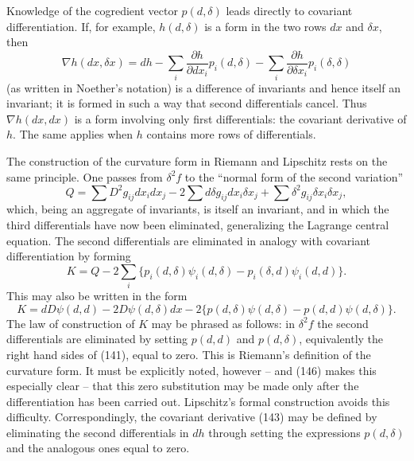 \documentclass[11pt]{article}
\begin{document}
Knowledge of the cogredient vector $p(d,\delta)$ leads directly to covariant differentiation. If, for example, $h(d,\delta)$ is a form in the two rows $dx$ and $\delta x$, then
\begin{equation}
  \nabla h(dx,\delta x)=dh-\sum_i \frac{\partial h}{\partial dx_i}p_i(d,\delta)-\sum_i\frac{\partial h}{\partial \delta x_i}p_i(\delta,\delta)            \tag{143}
\end{equation}
(as written in Noether's notation) is a difference of invariants and hence itself an invariant; it is formed in such a way that second differentials cancel. Thus $\nabla h(dx,dx)$ is a form involving only first differentials: the covariant derivative of $h$. The same applies when $h$ contains more rows of differentials.

The construction of the curvature form in Riemann and Lipschitz rests on the same principle. One passes from $\delta^2 f$ to the ``normal form of the second variation''
\begin{equation}
  Q=\sum D^2g_{ij}dx_i dx_j-2\sum d\delta g_{ij}dx_i\delta x_j+\sum \delta^2 g_{ij}\delta x_i\delta x_j,             \tag{144}
\end{equation}
which, being an aggregate of invariants, is itself an invariant, and in which the third differentials have now been eliminated, generalizing the Lagrange central equation. The second differentials are eliminated in analogy with covariant differentiation by forming
\begin{equation}
  K=Q-2\sum_i\{p_i(d,\delta)\psi_i(d,\delta)-p_i(\delta,d)\psi_i(d,d)\}.       \tag{145}
\end{equation}
This may also be written in the form
\begin{equation}
  K=dD\psi(d,d)-2D\psi(d,\delta)dx-2\{p(d,\delta)\psi(d,\delta)-p(d,d)\psi(d,\delta)\}.       \tag{146}
\end{equation}
The law of construction of $K$ may be phrased as follows: in $\delta^2 f$ the second differentials are eliminated by setting $p(d,d)$ and $p(d,\delta)$, equivalently the right hand sides of (141), equal to zero. This is Riemann's definition of the curvature form. It must be explicitly noted, however -- and (146) makes this especially clear -- that this zero substitution may be made only after the differentiation has been carried out. Lipschitz's formal construction avoids this difficulty. Correspondingly, the covariant derivative (143) may be defined by eliminating the second differentials in $dh$ through setting the expressions $p(d,\delta)$ and the analogous ones equal to zero.
\end{document}

